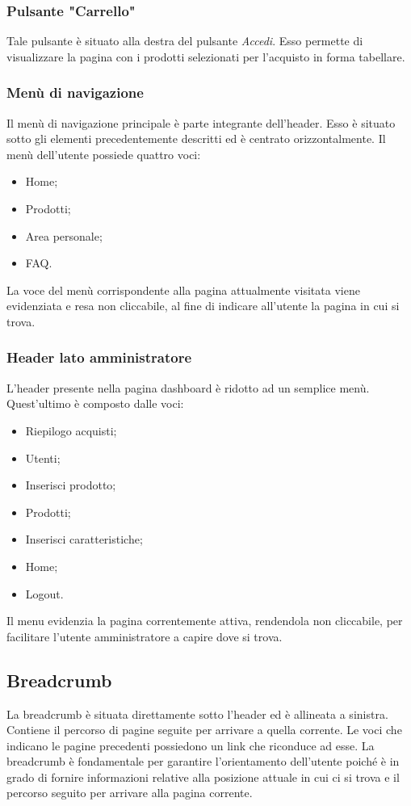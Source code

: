 \subsubsection{Pulsante "Carrello"}
Tale pulsante è situato alla destra del pulsante \textit{Accedi}. Esso permette di visualizzare la pagina con i prodotti selezionati per l'acquisto in forma tabellare.

\subsubsection{Menù di navigazione}
Il menù di navigazione principale è parte integrante dell'header. Esso è situato sotto gli elementi precedentemente descritti ed è centrato orizzontalmente. Il menù dell'utente possiede quattro voci:
\begin{itemize}
    \item Home;
    \item Prodotti;
    \item Area personale;
    \item FAQ.
\end{itemize}
La voce del menù corrispondente alla pagina attualmente visitata viene evidenziata e resa non cliccabile, al fine di indicare all'utente la pagina in cui si trova.

\subsubsection{Header lato amministratore}
L'header presente nella pagina dashboard è ridotto ad un semplice menù. Quest'ultimo è composto dalle voci:
\begin{itemize}
	\item Riepilogo acquisti;
	\item Utenti;
	\item Inserisci prodotto;
	\item Prodotti;
	\item Inserisci caratteristiche;
	\item Home;
	\item Logout.
\end{itemize}
Il menu evidenzia la pagina correntemente attiva, rendendola non cliccabile, per facilitare l'utente amministratore a capire dove si trova.

\subsection{Breadcrumb} 
La breadcrumb è situata direttamente sotto l'header ed è allineata a sinistra. Contiene il percorso di pagine seguite per arrivare a quella corrente. Le voci che indicano le pagine precedenti possiedono un link che riconduce ad esse. La breadcrumb è fondamentale per garantire l'orientamento dell'utente poiché è in grado di fornire informazioni relative alla posizione attuale in cui ci si trova e il percorso seguito per arrivare alla pagina corrente. 

